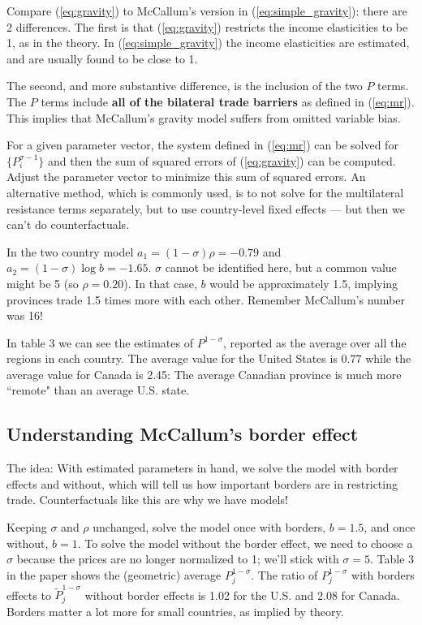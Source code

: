 \documentclass[11pt, pdftex]{article}
\newcommand{\sig}{\sigma}
\begin{document}
Compare (\ref{eq:gravity}) to McCallum's version in (\ref{eq:simple_gravity}): there are 2 differences.  The first is that (\ref{eq:gravity}) restricts the income elasticities to be 1, as in the theory.  In (\ref{eq:simple_gravity}) the income elasticities are estimated, and are usually found to be close to 1.

The second, and more substantive difference, is the inclusion of the two $P$ terms.  The $P$ terms include \textbf{all of the bilateral trade barriers} as defined in (\ref{eq:mr}).  This implies that McCallum's gravity model suffers from omitted variable bias.

For a given parameter vector, the system defined in (\ref{eq:mr}) can be solved for $\{P_i^{\sig-1}\}$ and then the sum of squared errors of (\ref{eq:gravity}) can be computed. Adjust the parameter vector to minimize this sum of squared errors.  An alternative method, which is commonly used, is to not solve for the multilateral resistance terms separately, but to use country-level fixed effects --- but then we can't do counterfactuals.

In the two country model $a_1=(1-\sig)\rho=-0.79$ and $a_2=(1-\sig)\log b=-1.65$.  $\sig$ cannot be identified here, but a common value might be 5 (so $\rho=0.20$).  In that case, $b$ would be approximately 1.5, implying provinces trade 1.5 times more with each other.  Remember McCallum's number was 16!

In table 3 we can see the estimates of $P^{1-\sigma}$, reported as the average over all the regions in each country.  The average value for the United States is 0.77 while the average value for Canada is 2.45: The average Canadian province is much more ``remote" than an average U.S. state.

\subsection*{Understanding McCallum's border effect}
The idea: With estimated parameters in hand, we solve the model with border effects and without, which will tell us how important borders are in restricting trade. Counterfactuals like this are why we have models!

 Keeping $\sigma$ and $\rho$ unchanged, solve the model once with borders, $b=1.5$, and once without, $b=1$. To solve the model without the border effect, we need to choose a $\sigma$ because the prices are no longer normalized to 1; we'll stick with $\sig=5$.  Table 3 in the paper shows the (geometric) average $P_j^{1-\sig}$.  The ratio of $P_j^{1-\sig}$ with borders effects to $\tilde{P}_j^{1-\sig}$ without border effects is 1.02 for the U.S. and 2.08 for Canada.  Borders matter a lot more for small countries, as implied by theory.
\end{document}

